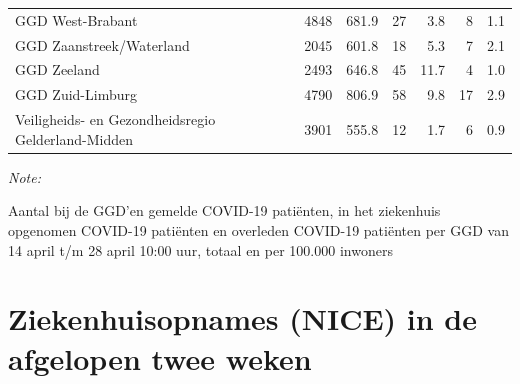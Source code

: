 \documentclass[
  english,
  man,floatsintext]{apa6}
\begin{document}
\begin{table}
\begin{threeparttable}
\begin{tabular}{lrrrrrr}
GGD West-Brabant & 4848 & 681.9 & 27 & 3.8 & 8 & 1.1\\
GGD Zaanstreek/Waterland & 2045 & 601.8 & 18 & 5.3 & 7 & 2.1\\
GGD Zeeland & 2493 & 646.8 & 45 & 11.7 & 4 & 1.0\\
GGD Zuid-Limburg & 4790 & 806.9 & 58 & 9.8 & 17 & 2.9\\
Veiligheids- en Gezondheidsregio Gelderland-Midden & 3901 & 555.8 & 12 & 1.7 & 6 & 0.9\\
\bottomrule
\end{tabular}
\begin{tablenotes}
\item \textit{Note: } 
\item Aantal bij de GGD’en gemelde COVID-19 patiënten, in het ziekenhuis opgenomen COVID-19 patiënten en overleden COVID-19 patiënten per GGD van 14 april t/m 28 april 10:00 uur, totaal en per 100.000 inwoners
\end{tablenotes}
\end{threeparttable}
\endgroup{}
\end{table}

\newpage

\hypertarget{ziekenhuisopnames-nice-in-de-afgelopen-twee-weken}{%
\section{Ziekenhuisopnames (NICE) in de afgelopen twee weken}\label{ziekenhuisopnames-nice-in-de-afgelopen-twee-weken}}
\end{document}
